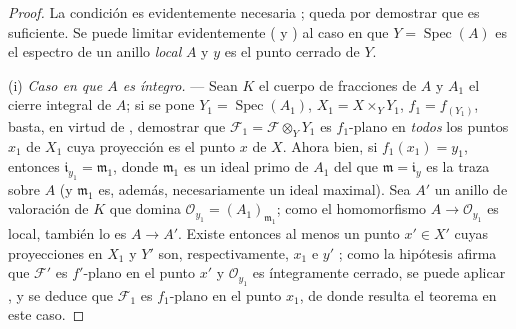 \begin{proof}
La condición es evidentemente necesaria ; queda por demostrar que es suficiente.
Se puede limitar evidentemente ( y ) al caso en que $Y=\operatorname{Spec}(A)$ es el espectro de un anillo \emph{local} $A$ y $y$ es el punto cerrado de $Y$.
\medskip

(i) \emph{Caso en que $A$ es íntegro.} --- Sean $K$ el cuerpo de fracciones de $A$ y $A_1$ el cierre integral de $A$; si se pone $Y_1=\operatorname{Spec}(A_1)$, $X_1=X\times_Y Y_1$, $f_1=f_{(Y_1)}$, basta, en virtud de , demostrar que $\mathcal F_1=\mathcal F\otimes_Y Y_1$ es $f_1$-plano en \emph{todos} los puntos $x_1$ de $X_1$ cuya proyección es el punto $x$ de $X$.
Ahora bien, si $f_1(x_1)=y_1$, entonces $\mathfrak i_{y_1}=\mathfrak m_1$, donde $\mathfrak m_1$ es un ideal primo de $A_1$ del que $\mathfrak m=\mathfrak i_y$ es la traza sobre $A$ (y $\mathfrak m_1$ es, además, necesariamente un ideal maximal). Sea $A'$ un anillo de valoración de $K$ que domina $\mathcal O_{y_1}=(A_1)_{\mathfrak m_1}$; como el homomorfismo $A\to\mathcal O_{y_1}$ es local, también lo es $A\to A'$.
Existe entonces al menos un
punto $x'\in X'$ cuyas proyecciones en $X_1$ y $Y'$ son, respectivamente, $x_1$ e $y'$ ; como la hipótesis afirma que $\mathcal F'$ es $f'$-plano en el punto $x'$ y $\mathcal O_{y_1}$ es íntegramente cerrado, se puede aplicar , y se deduce que $\mathcal F_1$ es $f_1$-plano en el punto $x_1$, de donde resulta el teorema en este caso.
\medskip


\end{proof}
